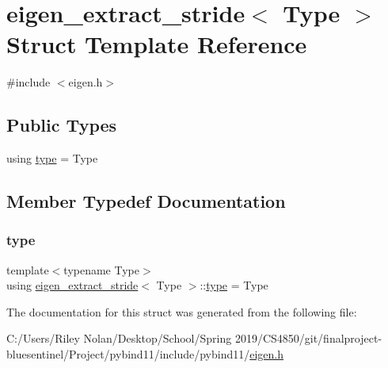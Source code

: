 \hypertarget{structeigen__extract__stride}{}\section{eigen\+\_\+extract\+\_\+stride$<$ Type $>$ Struct Template Reference}
\label{structeigen__extract__stride}


{\ttfamily \#include $<$eigen.\+h$>$}

\subsection*{Public Types}
\begin{DoxyCompactItemize}
\item 
using \mbox{\hyperlink{structeigen__extract__stride_accb64046a085e995039046e8a6811c7a}{type}} = Type
\end{DoxyCompactItemize}


\subsection{Member Typedef Documentation}
\mbox{\label{structeigen__extract__stride_accb64046a085e995039046e8a6811c7a}} 
\subsubsection{\texorpdfstring{type}{type}}
{\footnotesize\ttfamily template$<$typename Type$>$ \\
using \mbox{\hyperlink{structeigen__extract__stride}{eigen\+\_\+extract\+\_\+stride}}$<$ Type $>$\+::\mbox{\hyperlink{structeigen__extract__stride_accb64046a085e995039046e8a6811c7a}{type}} =  Type}



The documentation for this struct was generated from the following file\+:\begin{DoxyCompactItemize}
\item 
C\+:/\+Users/\+Riley Nolan/\+Desktop/\+School/\+Spring 2019/\+C\+S4850/git/finalproject-\/bluesentinel/\+Project/pybind11/include/pybind11/\mbox{\hyperlink{eigen_8h}{eigen.\+h}}\end{DoxyCompactItemize}
